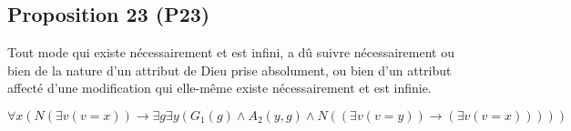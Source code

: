 \documentclass[10pt,a3paper]{article}
\begin{document}
\clearpage

\subsection{Proposition 23 (P23)}

\begin{center}
Tout mode qui existe nécessairement et est infini, a dû suivre nécessairement ou bien de la nature d’un attribut de Dieu prise absolument, ou bien d’un attribut affecté d’une modification qui elle-même existe nécessairement et est infinie.
\end{center}

\begin{center}
$\forall x (N(\exists v (v = x)) \rightarrow \exists g \exists y (G_1(g) \land A_2(y,g) \land N((\exists v (v = y)) \rightarrow (\exists v (v = x)))))$
\end{center}
\end{document}
